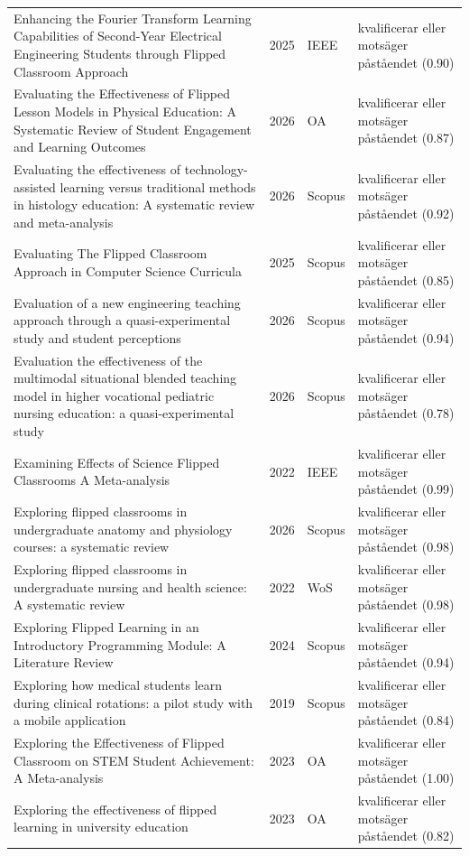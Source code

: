 \begin{longtable}{@{}%
  >{\raggedright\arraybackslash}p{}c%
  >{\raggedright\arraybackslash}p{}%
  >{\raggedright\arraybackslash}p{}@{}}
Enhancing the Fourier Transform Learning Capabilities of Second-Year Electrical Engineering Students through Flipped Classroom Approach & 2025 & IEEE & kvalificerar eller motsäger påståendet (0.90) \\
Evaluating the Effectiveness of Flipped Lesson Models in Physical Education: A Systematic Review of Student Engagement and Learning Outcomes & 2026 & OA & kvalificerar eller motsäger påståendet (0.87) \\
Evaluating the effectiveness of technology-assisted learning versus traditional methods in histology education: A systematic review and meta-analysis & 2026 & Scopus & kvalificerar eller motsäger påståendet (0.92) \\
Evaluating The Flipped Classroom Approach in Computer Science Curricula & 2025 & Scopus & kvalificerar eller motsäger påståendet (0.85) \\
Evaluation of a new engineering teaching approach through a quasi-experimental study and student perceptions & 2026 & Scopus & kvalificerar eller motsäger påståendet (0.94) \\
Evaluation the effectiveness of the multimodal situational blended teaching model in higher vocational pediatric nursing education: a quasi-experimental study & 2026 & Scopus & kvalificerar eller motsäger påståendet (0.78) \\
Examining Effects of Science Flipped Classrooms A Meta-analysis & 2022 & IEEE & kvalificerar eller motsäger påståendet (0.99) \\
Exploring flipped classrooms in undergraduate anatomy and physiology courses: a systematic review & 2026 & Scopus & kvalificerar eller motsäger påståendet (0.98) \\
Exploring flipped classrooms in undergraduate nursing and health science: A systematic review & 2022 & WoS & kvalificerar eller motsäger påståendet (0.98) \\
Exploring Flipped Learning in an Introductory Programming Module: A Literature Review & 2024 & Scopus & kvalificerar eller motsäger påståendet (0.94) \\
Exploring how medical students learn during clinical rotations: a pilot study with a mobile application & 2019 & Scopus & kvalificerar eller motsäger påståendet (0.84) \\
Exploring the Effectiveness of Flipped Classroom on STEM Student Achievement: A Meta-analysis & 2023 & OA & kvalificerar eller motsäger påståendet (1.00) \\
Exploring the effectiveness of flipped learning in university education & 2023 & OA & kvalificerar eller motsäger påståendet (0.82) \\

\end{longtable}
